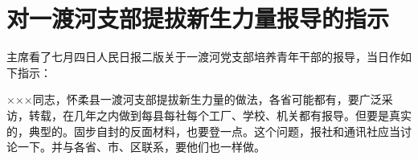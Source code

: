 \section[对一渡河支部提拔新生力量报导的指示（一九六四年七月四日）]{对一渡河支部提拔新生力量报导的指示}


主席看了七月四日人民日报二版关于一渡河党支部培养青年干部的报导，当日作如下指示：

×××同志，怀柔县一渡河支部提拔新生力量的做法，各省可能都有，要广泛采访，转载，在几年之内做到每县每社每个工厂、学校、机关都有报导。但要是真实的，典型的。固步自封的反面材料，也要登一点。这个问题，报社和通讯社应当讨论一下。并与各省、市、区联系，要他们也一样做。

